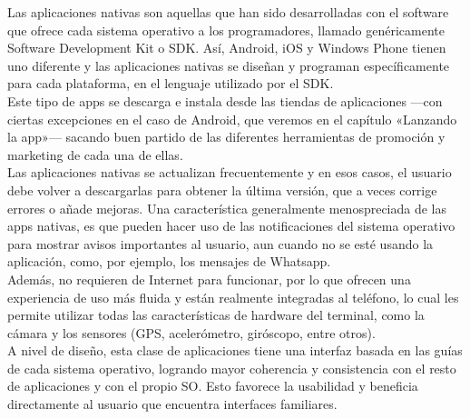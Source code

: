 
Las aplicaciones nativas son aquellas que han sido desarrolladas con el software que ofrece cada sistema operativo a los programadores, llamado genéricamente Software Development Kit o SDK. Así, Android, iOS y Windows Phone tienen uno diferente y las aplicaciones nativas se diseñan y programan específicamente para cada plataforma, en el lenguaje utilizado por el SDK.\\
Este tipo de apps se descarga e instala desde las tiendas de aplicaciones ---con ciertas excepciones en el caso de Android, que veremos en el capítulo «Lanzando la app»--- sacando buen partido de las diferentes herramientas de promoción y marketing de cada una de ellas.\\
Las aplicaciones nativas se actualizan frecuentemente y en esos casos, el usuario debe volver a descargarlas para obtener la última versión, que a veces corrige errores o añade mejoras.
Una característica generalmente menospreciada de las apps nativas, es que pueden hacer uso de las notificaciones del sistema operativo para mostrar avisos importantes al usuario, aun cuando no se esté usando la aplicación, como, por ejemplo, los mensajes de Whatsapp.\\
Además, no requieren de Internet para funcionar, por lo que ofrecen una experiencia de uso más fluida y están realmente integradas al teléfono, lo cual les permite utilizar todas las características de hardware del terminal, como la cámara y los sensores (GPS, acelerómetro, giróscopo, entre otros).\\
A nivel de diseño, esta clase de aplicaciones tiene una interfaz basada en las guías de cada sistema operativo, logrando mayor coherencia y consistencia con el resto de aplicaciones y con el propio SO. Esto favorece la usabilidad y beneficia directamente al usuario que encuentra interfaces familiares.\\


